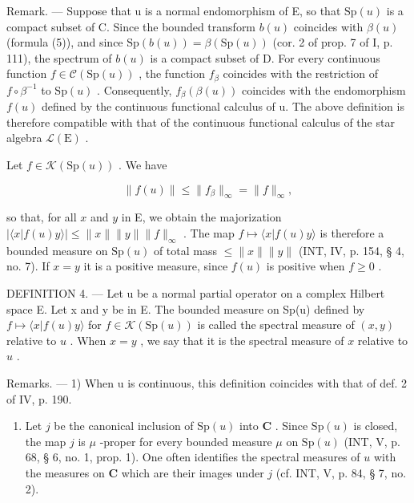 Remark. --- Suppose that u is a normal endomorphism of E, so that \(\mathrm{Sp}(u)\) is a compact subset of C. Since the bounded transform \(b(u)\) coincides with \(\beta(u)\) (formula (5)), and since \(\mathrm{Sp}(b(u)) = \beta(\mathrm{Sp}(u))\) (cor. 2 of prop. 7 of I, p. 111), the spectrum of \(b(u)\) is a compact subset of D. For every continuous function \(f \in \mathcal{C}(\mathrm{Sp}(u))\) , the function \(f_{\beta}\) coincides with the restriction of \(f \circ \beta^{-1}\) to \(\mathrm{Sp}(u)\) . Consequently, \(f_{\beta}(\beta(u))\) coincides with the endomorphism \(f(u)\) defined by the continuous functional calculus of u. The above definition is therefore compatible with that of the continuous functional calculus of the star algebra \(\mathcal{L}(\mathrm{E})\) .

Let \(f\in \mathcal{K}(\mathrm{Sp}(u))\) . We have

\[
\| f (u) \| \leqslant \| f _ {\beta} \| _ {\infty} = \| f \| _ {\infty},
\]

so that, for all \(x\) and \(y\) in E, we obtain the majorization \(|\langle x | f(u)y\rangle| \leqslant \|x\|\|y\|\|f\|_{\infty}\) . The map \(f \mapsto \langle x | f(u)y\rangle\) is therefore a bounded measure on \(\mathrm{Sp}(u)\) of total mass \(\leqslant \|x\|\|y\|\) (INT, IV, p. 154, § 4, no. 7). If \(x = y\) it is a positive measure, since \(f(u)\) is positive when \(f \geqslant 0\) .

DEFINITION 4. --- Let u be a normal partial operator on a complex Hilbert space E. Let x and y be in E. The bounded measure on Sp(u) defined by \(f \mapsto \langle x | f(u)y \rangle\) for \(f \in \mathcal{K}(\mathrm{Sp}(u))\) is called the spectral measure of \((x,y)\) relative to \(u\) . When \(x = y\) , we say that it is the spectral measure of \(x\) relative to \(u\) .

Remarks. --- 1) When u is continuous, this definition coincides with that of def. 2 of IV, p. 190.

\begin{enumerate}
\def\labelenumi{\arabic{enumi})}
\setcounter{enumi}{1}
\tightlist
\item
  Let \(j\) be the canonical inclusion of \(\mathrm{Sp}(u)\) into \(\mathbf{C}\) . Since \(\mathrm{Sp}(u)\) is closed, the map \(j\) is \(\mu\) -proper for every bounded measure \(\mu\) on \(\mathrm{Sp}(u)\) (INT, V, p. 68, § 6, no. 1, prop. 1). One often identifies the spectral measures of \(u\) with the measures on \(\mathbf{C}\) which are their images under \(j\) (cf. INT, V, p. 84, § 7, no. 2).
\end{enumerate}

